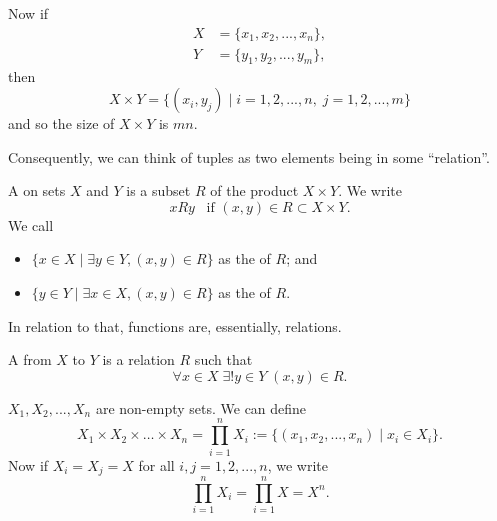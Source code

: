 \documentclass[notoc,notitlepage]{tufte-book}
\begin{document}
\begin{note}
  Now if
  \begin{align*}
    X &= \{ x_1, x_2, ..., x_n \}, \\
    Y &= \{ y_1, y_2, ..., y_m \},
  \end{align*}
  then
  \begin{equation*}
    X \times Y = \{ (x_i, y_j) \mid i = 1, 2, ..., n, \; j = 1, 2, ..., m \}
  \end{equation*}
  and so the size of $X \times Y$ is $mn$.
\end{note}

Consequently, we can think of tuples as two elements being in some ``relation''.

\begin{defn}[Relation]
\label{defn:relation}
  A  on sets $X$ and $Y$ is a subset $R$ of the product $X \times Y$. We write
  \begin{equation*}
    xRy \enspace \text{ if } (x, y) \in R \subset X \times Y.
  \end{equation*}
  We call
  \begin{itemize}
    \item $\{ x \in X \mid \exists y \in Y, (x, y) \in R \}$ as the  of $R$; and 
    \item $\{ y \in Y \mid \exists x \in X, (x, y) \in R \}$ as the  of $R$.
  \end{itemize}
\end{defn}

In relation to that, functions are, essentially, relations.

\begin{defn}[Function]
\label{defn:function}
  A  from $X$ to $Y$ is a relation $R$ such that
  \begin{equation*}
    \forall x \in X \; \exists! y \in Y \; (x, y) \in R.
  \end{equation*}
\end{defn}

 $X_1, X_2, ..., X_n$ are non-empty sets. We can define
\begin{equation*}
  X_1 \times X_2 \times \hdots \times X_n = \prod_{i=1}^{n} X_i := \{ (x_1, x_2, ..., x_n) \mid x_i \in X_i \}.
\end{equation*}
Now if $X_i = X_j = X$ for all $i, j = 1, 2, ..., n$, we write
\begin{equation*}
  \prod_{i=1}^{n} X_i = \prod_{i=1}^{n} X = X^n.
\end{equation*}
\end{document}
